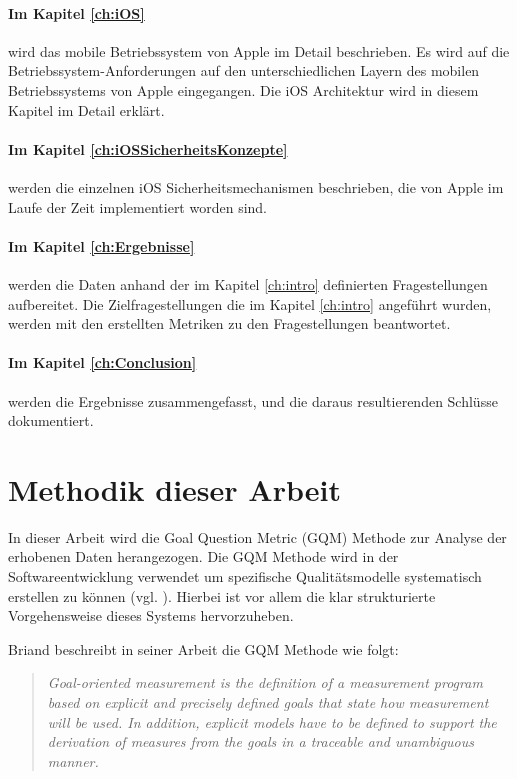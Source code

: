 \paragraph{Im Kapitel \ref{ch:iOS}} wird das mobile Betriebssystem von Apple im Detail beschrieben. Es wird auf die Betriebssystem-Anforderungen auf den unterschiedlichen Layern des mobilen Betriebssystems von Apple eingegangen. Die iOS Architektur wird in diesem Kapitel im Detail erklärt. 

\paragraph{Im Kapitel \ref{ch:iOSSicherheitsKonzepte}} werden die einzelnen iOS Sicherheitsmechanismen beschrieben, die von Apple im Laufe der Zeit implementiert worden sind.

\paragraph{Im Kapitel \ref{ch:Ergebnisse}} werden die Daten anhand der im Kapitel \ref{ch:intro} definierten Fragestellungen aufbereitet. Die Zielfragestellungen die im Kapitel \ref{ch:intro} angeführt wurden, werden mit den erstellten Metriken zu den Fragestellungen beantwortet.

\paragraph{Im Kapitel \ref{ch:Conclusion}} werden die Ergebnisse zusammengefasst, und die daraus resultierenden Schlüsse dokumentiert.

\section{Methodik dieser Arbeit}
\label{sec:MethArbeit}
In dieser Arbeit wird die Goal Question Metric (GQM) Methode zur Analyse der erhobenen Daten herangezogen. Die GQM Methode wird in der Softwareentwicklung verwendet um spezifische Qualitätsmodelle systematisch erstellen zu können (vgl. \cite{GQM[1], GQM[2]}).  Hierbei ist vor allem die klar strukturierte Vorgehensweise dieses Systems hervorzuheben.\par

Briand beschreibt in seiner Arbeit die GQM Methode wie folgt: 
\begin{quote}
\textit{\glqq Goal-oriented measurement is the definition of a measurement program based on explicit and precisely defined goals that state how measurement will be used. In addition, explicit models have to be defined to support the derivation of measures from the goals in a traceable and unambiguous manner.\grqq{}} \cite{GQM[5]} 
\end{quote}

